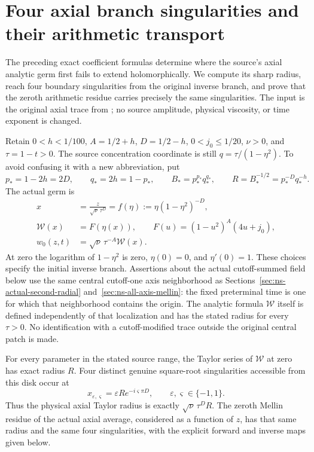 \section{Four axial branch singularities and their arithmetic transport}
\label{sec:ns-axial-branch-radius}

The preceding exact coefficient formulas determine where the source's
axial analytic germ first fails to extend holomorphically. We compute its
sharp radius, reach four boundary singularities from the original inverse
branch, and prove that the zeroth arithmetic residue carries precisely
the same singularities. The input is the original axial trace from
\cite[Appendix B, pp.~144--147]{openaiNS2026release}; no source amplitude,
physical viscosity, or time exponent is changed.

Retain $0<h<1/100$, $A=1/2+h$, $D=1/2-h$, $0<j_0\leq1/20$,
$\nu>0$, and $\tau=1-t>0$. The source concentration coordinate is still
$q=\tau/(1-\eta^2)$. To avoid confusing it with a new abbreviation, put
\begin{equation}\label{nab:parameters}
 p_*=1-2h=2D,\qquad q_*=2h=1-p_*,\qquad
 B_*=p_*^{p_*}q_*^{q_*},\qquad
 R=B_*^{-1/2}=p_*^{-D}q_*^{-h}.
\end{equation}
The actual germ is
\begin{equation}\label{nab:germ}
 \begin{split}
 x&=\frac{z}{\sqrt\nu\,\tau^D}
       =f(\eta):=\eta(1-\eta^2)^{-D},\\
 \mathcal W(x)&=F(\eta(x)),\qquad
 F(u)=(1-u^2)^A(4u+j_0),\\
 w_0(z,t)&=\sqrt\nu\,\tau^{-A}\mathcal W(x).
 \end{split}
\end{equation}
At zero the logarithm of $1-\eta^2$ is zero, $\eta(0)=0$, and
$\eta'(0)=1$. These choices specify the initial inverse branch.
Assertions about the actual cutoff-summed field below use the same
central cutoff-one axis neighborhood as Sections~\ref{sec:ns-actual-second-radial}
and~\ref{sec:ns-all-axis-mellin}: the fixed preterminal time is one for
which that neighborhood contains the origin. The analytic formula
$\mathcal W$ itself is defined independently of that localization and
has the stated radius for every $\tau>0$. No identification with a
cutoff-modified trace outside the original central patch is made.

\begin{theorem}\label{nab:radius-theorem}
For every parameter in the stated source range, the Taylor series of
$\mathcal W$ at zero has exact radius $R$. Four distinct genuine
square-root singularities accessible from this disk occur at
\begin{equation}\label{nab:critical-values}
 x_{\varepsilon,\varsigma}
      =\varepsilon R e^{-i\varsigma\pi D},
       \qquad \varepsilon,\varsigma\in\{-1,1\}.
\end{equation}
Thus the physical axial Taylor radius is exactly
$\sqrt\nu\,\tau^D R$. The zeroth Mellin residue of the actual axial
average, considered as a function of $z$, has that same radius and the
same four singularities, with the explicit forward and inverse maps
given below.
\end{theorem}

